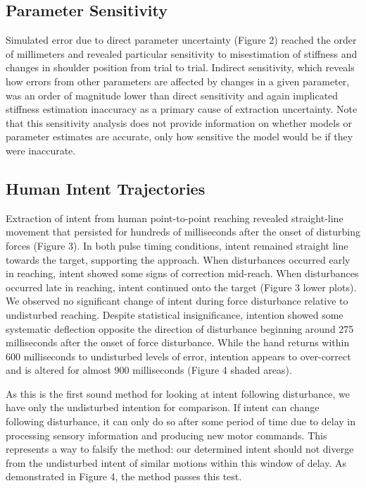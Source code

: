 \documentclass[10pt]{article}
\begin{document}
\subsection*{Parameter Sensitivity}
Simulated error due to direct parameter uncertainty (Figure 2) reached the order of millimeters and revealed particular sensitivity to misestimation of stiffness and changes in shoulder position from trial to trial. Indirect sensitivity, which reveals how errors from other parameters are affected by changes in a given parameter, was an order of magnitude lower than direct sensitivity and again implicated stiffness estimation inaccuracy as a primary cause of extraction uncertainty. Note that this sensitivity analysis does not provide information on whether models or parameter estimates are accurate, only how sensitive the model would be if they were inaccurate. 

\subsection*{Human Intent Trajectories}
Extraction of intent from human point-to-point reaching revealed straight-line movement that persisted for hundreds of milliseconds after the onset of disturbing forces (Figure 3). In both pulse timing conditions, intent remained straight line towards the target, supporting the approach.  When disturbances occurred early in reaching, intent showed some signs of correction mid-reach. When disturbances occurred late in reaching, intent continued onto the target (Figure 3 lower plots). We observed no significant change of intent during force disturbance relative to undisturbed reaching. Despite statistical insignificance, intention showed some systematic deflection opposite the direction of disturbance beginning around 275 milliseconds after the onset of force disturbance. While the hand returns within 600 milliseconds to undisturbed levels of error, intention appears to over-correct and is altered for almost 900 milliseconds (Figure 4 shaded areas). 

As this is the first sound method for looking at intent following disturbance, we have only the undisturbed intention for comparison. If intent can change following disturbance, it can only do so after some period of time due to delay in processing sensory information and producing new motor commands. This represents a way to falsify the method: our determined intent should not diverge from the undisturbed intent of similar motions within this window of delay. As demonstrated in Figure 4, the method passes this test. 
\end{document}
